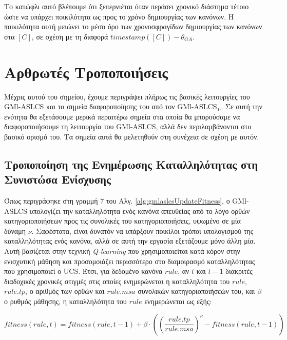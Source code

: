 Το κατώφλι αυτό βλέπουμε ότι ξεπερνιέται όταν περάσει χρονικό διάστημα τέτοιο ώστε να υπάρχει ποικιλότητα ως προς το χρόνο δημιουργίας των κανόνων. Η ποικιλότητα αυτή μειώνει το μέσο όρο των χρονοσφραγίδων δημιουργίας των κανόνων στα $[C]$, σε σχέση με τη διαφορά $timestamp([C]) - \theta_{GA}$.


\section{Αρθρωτές Τροποποιήσεις}
\label{sec:alterations}
Μέχρις αυτού του σημείου, έχουμε περιγράψει πλήρως τις βασικές λειτουργίες του GMl-ASLCS και τα σημεία διαφοροποίησης του από τον GMl-ASLCS$_{\:0}$. Σε αυτή την ενότητα θα εξετάσουμε μερικά περαιτέρω σημεία στα οποία θα μπορούσαμε να διαφοροποιήσουμε τη λειτουργία του GMl-ASLCS, αλλά δεν περιλαμβάνονται στο βασικό ορισμό του. Τα σημεία αυτά θα μελετηθούν στη συνέχεια σε σχέση με αυτόν.





\subsection{Τροποποίηση της Ενημέρωσης Καταλληλότητας στη Συνιστώσα Ενίσχυσης}
\label{subsec:qfitness}
Όπως περιγράφηκε στη γραμμή $7$ του Αλγ. \ref{alg:gmlaslcsUpdateFitness}, ο GMl-ASLCS υπολογίζει την καταλληλότητα ενός κανόνα απευθείας από το λόγο ορθών κατηγοριοποιήσεων προς τις συνολικές του κατηγοριοποιήσεις, υψωμένο σε μία δύναμη $\nu$. Σαφέστατα, είναι δυνατόν να υπάρξουν ποικίλοι τρόποι υπολογισμού της καταλληλότητας ενός κανόνα, αλλά σε αυτή την εργασία εξετάζουμε μόνο άλλη μία. Αυτή βασίζεται στην τεχνική \emph{Q-learning} \cite{WilsonZCS} που χρησιμοποιείται κατά κόρον στην ενισχυτική μάθηση και προσομοιάζει περισσότερο στο διαμοιρασμό καταλληλότητας που χρησιμοποιεί ο UCS. Έτσι, για δεδομένο κανόνα $rule$, αν $t$ και $t-1$ διακριτές διαδοχικές χρονικές στιγμές στις οποίες ενημερώνεται η καταλληλότητα του $rule$, $rule.tp$, ο αριθμός των ορθών και $rule.msa$ συνολικών κατηγοριοποιήσεών του, και $\beta$ ο ρυθμός μάθησης, η καταλληλότητα του $rule$ ενημερώνεται ως εξής:

\begin{equation}
fitness(rule,t) = fitness(rule, t-1) + \beta \cdot \left(\left(\frac{rule.tp}{rule.msa}\right)^{\nu} - fitness(rule, t-1)\right)
\end{equation}


